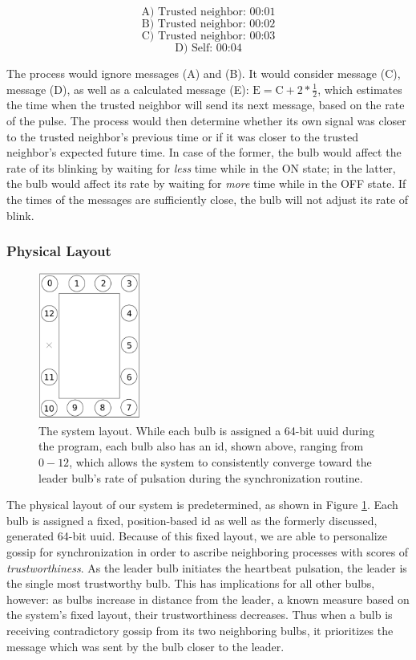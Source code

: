 \documentclass[preprint,review,12pt]{cs262}
\begin{document}
$$ \text{A) Trusted neighbor:  00:01}$$
$$ \text{B) Trusted neighbor:  00:02}$$
$$ \text{C) Trusted neighbor:  00:03}$$
$$ \text{D) Self:  00:04}$$

The process would ignore messages (A) and (B). It would consider message (C), message (D), as well as a calculated message (E): $\text{E} = \text{C} + 2 * \frac{1}{2} $, which estimates the time when the trusted neighbor will send its next message, based on the rate of the pulse. The process would then determine whether its own signal was closer to the trusted neighbor's previous time or if it was closer to the trusted neighbor's expected future time. In case of the former, the bulb would affect the rate of its blinking by waiting for \emph{less} time while in the ON state; in the latter, the bulb would affect its rate by waiting for \emph{more} time while in the OFF state. If the times of the messages are sufficiently close, the bulb will not adjust its rate of blink. 


\subsubsection{Physical Layout}
\label{layout}

\begin{figure}[h]
  \centering
  \includegraphics[width=0.3\textwidth]{figures/system_layout}
  \caption{The system layout. While each bulb is assigned a 64-bit uuid during the program, each bulb also has an id, shown above, ranging from $0-12$, which allows the system to consistently converge toward the leader bulb's rate of pulsation during the synchronization routine. 
 \label{fig:layout}}
\end{figure}

The physical layout of our system is predetermined, as shown in Figure \ref{fig:layout}. Each bulb is assigned a fixed, position-based id as well as the formerly discussed, generated 64-bit uuid. Because of this fixed layout, we are able to personalize gossip for synchronization in order to ascribe neighboring processes with scores of \emph{trustworthiness}. As the leader bulb initiates the heartbeat pulsation, the leader is the single most trustworthy bulb. This has implications for all other bulbs, however: as bulbs increase in distance from the leader, a known measure based on the system's fixed layout, their trustworthiness decreases. Thus when a bulb is receiving contradictory gossip from its two neighboring bulbs, it prioritizes the message which was sent by the bulb closer to the leader.  
\end{document}
